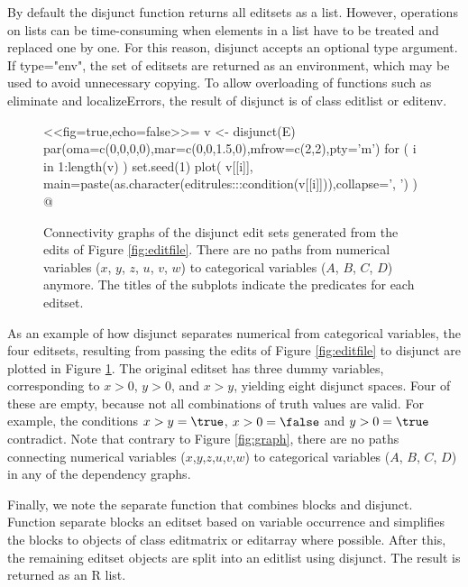 \documentclass[11pt,fleqn,a4paper]{article}
\begin{document}
By default the {\sf disjunct} function returns all {\sf editset}s as a {\sf
list}. However, operations on lists can be time-consuming when elements in a
list have to be treated and replaced one by one. For this reason, {\sf
disjunct} accepts an optional {\sf type} argument.  If {\sf type="env"}, the
set of {\sf editsets} are returned as an environment, which may be used to
avoid unnecessary copying. To allow overloading of functions such as {\sf
eliminate} and {\sf localizeErrors}, the result of {\sf disjunct} is of class
{\sf editlist} or {\sf editenv}. 

\begin{figure}
<<fig=true,echo=false>>=
v <- disjunct(E)
par(oma=c(0,0,0,0),mar=c(0,0,1.5,0),mfrow=c(2,2),pty='m')
for ( i in 1:length(v) ){
    set.seed(1)
    plot(
        v[[i]],
        main=paste(as.character(editrules:::condition(v[[i]])),collapse=', ')
    )
}
@
\caption{Connectivity graphs of the disjunct edit sets
generated from the edits of Figure \ref{fig:editfile}. There are no paths from
numerical variables ($x$, $y$, $z$, $u$, $v$, $w$) to categorical 
variables ($A$, $B$, $C$, $D$) anymore. The titles of the subplots indicate
the predicates for each {\sf editset}.}
\label{figdisjunct}
\end{figure}
%
%
As an example of how {\sf disjunct} separates numerical from categorical
variables, the four editsets, resulting from passing the edits of Figure
\ref{fig:editfile} to {\sf disjunct} are plotted in Figure \ref{figdisjunct}.
The original editset has three dummy variables, corresponding to $x>0$, $y>0$,
and $x>y$, yielding eight disjunct spaces. Four of these are empty, because not
all combinations of truth values are valid. For example, the conditions
$x>y=\true$, $x>0=\false$ and $y>0=\true$ contradict.  Note that contrary to
Figure \ref{fig:graph}, there are no paths connecting numerical variables
($x$,$y$,$z$,$u$,$v$,$w$) to categorical variables ($A$, $B$, $C$, $D$) in any
of the dependency graphs.

Finally, we note the {\sf separate} function that combines {\sf blocks} and
{\sf disjunct}. Function {\sf separate} blocks an editset based on variable
occurrence and simplifies the blocks to objects of class {\sf editmatrix} or
{\sf editarray} where possible. After this, the remaining {\sf editset} objects
are split into an {\sf editlist} using {\sf disjunct}. The result is returned
as an {\sf R} {\sf list}. 
\end{document}
